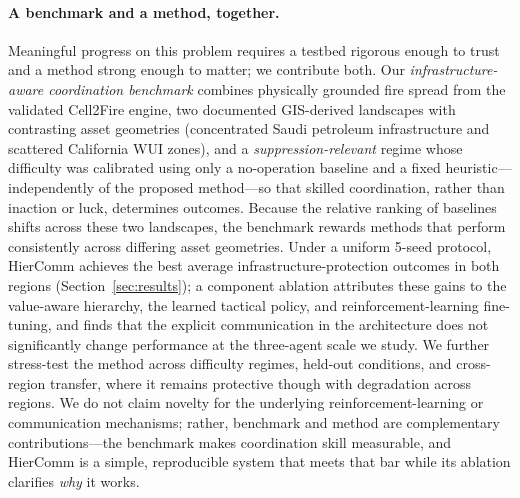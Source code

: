 \documentclass[letterpaper]{article}
\begin{document}
\paragraph{A benchmark and a method, together.}
Meaningful progress on this problem requires a testbed rigorous enough to trust and a method strong enough to matter; we contribute both. Our \emph{infrastructure-aware coordination benchmark} combines physically grounded fire spread from the validated Cell2Fire engine, two documented GIS-derived landscapes with contrasting asset geometries (concentrated Saudi petroleum infrastructure and scattered California WUI zones), and a \emph{suppression-relevant} regime whose difficulty was calibrated using only a no-operation baseline and a fixed heuristic---independently of the proposed method---so that skilled coordination, rather than inaction or luck, determines outcomes. Because the relative ranking of baselines shifts across these two landscapes, the benchmark rewards methods that perform consistently across differing asset geometries. Under a uniform 5-seed protocol, HierComm achieves the best average infrastructure-protection outcomes in both regions (Section~\ref{sec:results}); a component ablation attributes these gains to the value-aware hierarchy, the learned tactical policy, and reinforcement-learning fine-tuning, and finds that the explicit communication in the architecture does not significantly change performance at the three-agent scale we study. We further stress-test the method across difficulty regimes, held-out conditions, and cross-region transfer, where it remains protective though with degradation across regions. We do not claim novelty for the underlying reinforcement-learning or communication mechanisms; rather, benchmark and method are complementary contributions---the benchmark makes coordination skill measurable, and HierComm is a simple, reproducible system that meets that bar while its ablation clarifies \emph{why} it works.
\end{document}
